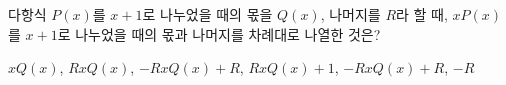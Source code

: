 다항식 $P(x)$를 $x+1$로 나누었을 때의 몫을 $Q(x)$, 나머지를 $R$라 할 때, $xP(x)$를 $x+1$로 나누었을 때의 몫과 나머지를 차례대로 나열한 것은?
\begin{choicesii}{$xQ(x)$, $R$}{$xQ(x)$, $-R$}{$xQ(x)+R$, $R$}{$xQ(x)+1$, $-R$}{$xQ(x)+R$, $-R$}\end{choicesii}
